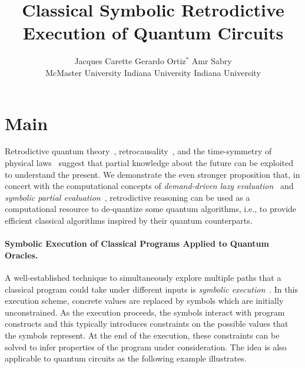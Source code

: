 \documentclass{article}
\title{Classical Symbolic Retrodictive Execution of Quantum Circuits}
\author{Jacques Carette \qquad\qquad Gerardo Ortiz$^{*}$ \qquad\qquad Amr Sabry \\
McMaster University \qquad Indiana University \qquad Indiana University}
\begin{document}
\maketitle

\section{Main}

Retrodictive quantum theory~\cite{sym13040586},
retrocausality~\cite{Aharonov2008}, and the time-symmetry of physical
laws~\cite{RevModPhys.27.179} suggest that partial knowledge about the
future can be exploited to understand the present. We demonstrate the
even stronger proposition that, in concert with the computational
concepts of \emph{demand-driven lazy evaluation}~\cite{lazyevaluator}
and \emph{symbolic partial evaluation}~\cite{futamura}, retrodictive
reasoning can be used as a computational resource to de-quantize some
quantum algorithms, i.e., to provide efficient classical algorithms
inspired by their quantum counterparts.

\paragraph*{Symbolic Execution of Classical Programs Applied to Quantum Oracles.}
A well-established technique to simultaneously explore multiple paths
that a classical program could take under different inputs is
\emph{symbolic
  execution}~\cite{10.1145/390016.808445,10.1145/360248.360252,howden,10.1145/800191.805647,10.1145/3182657}. In
this execution scheme, concrete values are replaced by symbols which are
initially unconstrained. As the execution proceeds, the symbols
interact with program constructs and this typically introduces
constraints on the possible values that the symbols represent. At the
end of the execution, these constraints can be solved to infer
properties of the program under consideration. The idea is also
applicable to quantum circuits as the following example illustrates.
\end{document}
